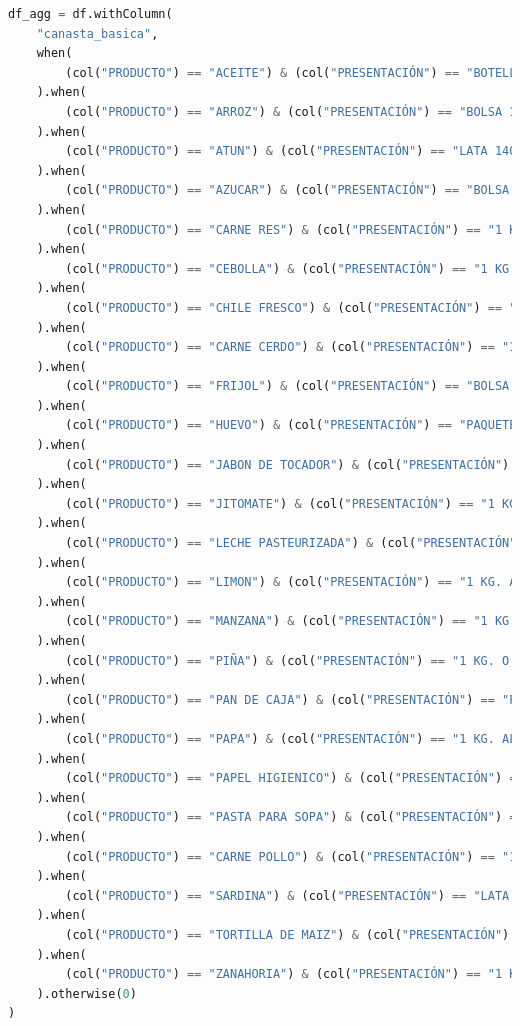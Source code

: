 \documentclass{article}
\begin{document}
\begin{lstlisting}[language=Python, caption={python version}]
df_agg = df.withColumn(
    "canasta_basica",
    when(
        (col("PRODUCTO") == "ACEITE") & (col("PRESENTACIÓN") == "BOTELLA 946 ML. MIXTO"), 1
    ).when(
        (col("PRODUCTO") == "ARROZ") & (col("PRESENTACIÓN") == "BOLSA 1 KG. SUPER EXTRA"), 1
    ).when(
        (col("PRODUCTO") == "ATUN") & (col("PRESENTACIÓN") == "LATA 140 GR. EN HOJUELAS EN AGUA"), 1
    ).when(
        (col("PRODUCTO") == "AZUCAR") & (col("PRESENTACIÓN") == "BOLSA PLASTICO 2 KG. REFINADA"), 1
    ).when(
        (col("PRODUCTO") == "CARNE RES") & (col("PRESENTACIÓN") == "1 KG. GRANEL. FALDA O PARA DESHEBRAR"), 1
    ).when(
        (col("PRODUCTO") == "CEBOLLA") & (col("PRESENTACIÓN") == "1 KG. BLANCA SIN RABO"), 1
    ).when(
        (col("PRODUCTO") == "CHILE FRESCO") & (col("PRESENTACIÓN") == "1 KG. JALAPEÑO O CUARESMEÑO"), 1
    ).when(
        (col("PRODUCTO") == "CARNE CERDO") & (col("PRESENTACIÓN") == "1 KG. GRANEL. MILANESA O MILANESA DE PIERNA"), 1
    ).when(
        (col("PRODUCTO") == "FRIJOL") & (col("PRESENTACIÓN") == "BOLSA 1 KG. NEGRO"), 1
    ).when(
        (col("PRODUCTO") == "HUEVO") & (col("PRESENTACIÓN") == "PAQUETE CON 12 BLANCO"), 1
    ).when(
        (col("PRODUCTO") == "JABON DE TOCADOR") & (col("PRESENTACIÓN") == "BARRA 180 GR."), 1
    ).when(
        (col("PRODUCTO") == "JITOMATE") & (col("PRESENTACIÓN") == "1 KG. SALADETTE/ HUAJE O TOMATE SALADETTE/ HUAJE"), 1
    ).when(
        (col("PRODUCTO") == "LECHE PASTEURIZADA") & (col("PRESENTACIÓN") == "CAJA 1 LT."), 1
    ).when(
        (col("PRODUCTO") == "LIMON") & (col("PRESENTACIÓN") == "1 KG. AGRIO CON SEMILLA O LIMON COLIMA"), 1
    ).when(
        (col("PRODUCTO") == "MANZANA") & (col("PRESENTACIÓN") == "1 KG. GOLDEN"), 1
    ).when(
        (col("PRODUCTO") == "PIÑA") & (col("PRESENTACIÓN") == "1 KG. O PIÑA ESMERALDA O PIÑA CAYENA"), 1
    ).when(
        (col("PRODUCTO") == "PAN DE CAJA") & (col("PRESENTACIÓN") == "PAQUETE GRANDE 680 GR. REBANADO BLANCO"), 1
    ).when(
        (col("PRODUCTO") == "PAPA") & (col("PRESENTACIÓN") == "1 KG. ALFA/BLANCA"), 1
    ).when(
        (col("PRODUCTO") == "PAPEL HIGIENICO") & (col("PRESENTACIÓN") == "PAQUETE 12 ROLLOS. 200 HOJAS DOBLES"), 1
    ).when(
        (col("PRODUCTO") == "PASTA PARA SOPA") & (col("PRESENTACIÓN") == "PAQUETE 200 GR. SPAGHETTI"), 1
    ).when(
        (col("PRODUCTO") == "CARNE POLLO") & (col("PRESENTACIÓN") == "1 KG. GRANEL. PECHUGA CON HUESO O ANATÓMICA O SIN RABADILLA (CON PIEL)"), 1
    ).when(
        (col("PRODUCTO") == "SARDINA") & (col("PRESENTACIÓN") == "LATA 425 GR. EN TOMATE"), 1
    ).when(
        (col("PRODUCTO") == "TORTILLA DE MAIZ") & (col("PRESENTACIÓN") == "1 KG. GRANEL"), 1
    ).when(
        (col("PRODUCTO") == "ZANAHORIA") & (col("PRESENTACIÓN") == "1 KG. MEDIANA"), 1
    ).otherwise(0)
)


\end{lstlisting}
\end{document}

